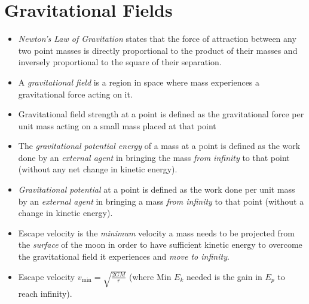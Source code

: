 \documentclass[oneside]{book}
\begin{document}
\chapter{Gravitational Fields}
\begin{itemize}
    \item \emph{Newton's Law of Gravitation} states that the force of attraction between any two point masses is directly proportional to the product of their masses and inversely proportional to the square of their separation.
    \item A \emph{gravitational field} is a region in space where mass experiences a gravitational force acting on it.
    \item Gravitational field strength at a point is defined as the gravitational force per unit mass acting on a small mass placed at that point
    \item The \emph{gravitational potential energy} of a mass at a point is defined as the work done by an \emph{external agent} in bringing the mass \emph{from infinity} to that point (without any net change in kinetic energy).
    \item \emph{Gravitational potential} at a point is defined as the work done per unit mass by an \emph{external agent} in bringing a mass \emph{from infinity} to that point (without a change in kinetic energy).
    \item Escape velocity is the \emph{minimum} velocity a mass needs to be projected from the \emph{surface} of the moon in order to have sufficient kinetic energy to overcome the gravitational field it experiences and \emph{move to infinity}.
    \item Escape velocity \(v_\text{min}=\sqrt{\frac{2GM}{r}}\) (where Min \(E_k\) needed is the gain in \(E_p\) to reach infinity).
\end{itemize}
\end{document}
